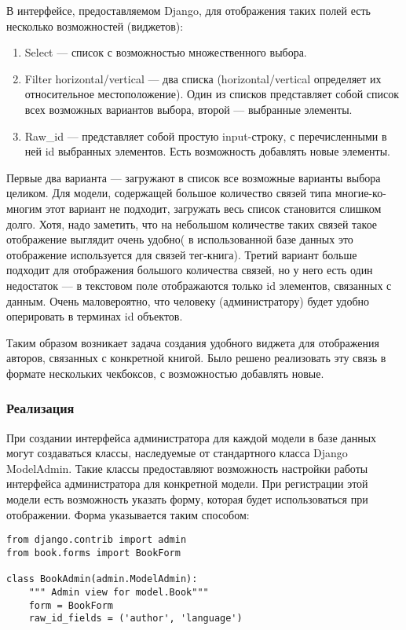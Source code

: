 В интерфейсе, предоставляемом Django, для отображения таких полей есть несколько возможностей (виджетов):
\begin{enumerate}
	\item Select --- список с возможностью множественного выбора.
	\item Filter horizontal/vertical --- два списка (horizontal/vertical определяет их относительное местоположение). Один из списков представляет собой список всех возможных вариантов выбора, второй --- выбранные элементы.
	\item Raw\_id --- представляет собой простую input-строку, с перечисленными в ней id выбранных элементов. Есть возможность добавлять новые элементы.
\end{enumerate}
Первые два варианта --- загружают в список все возможные варианты выбора целиком. Для модели, содержащей большое количество связей типа многие-ко-многим этот вариант не подходит, \tk загружать весь список становится слишком долго. Хотя, надо заметить, что на небольшом количестве таких связей такое отображение выглядит очень удобно( в использованной базе данных это отображение используется для связей тег-книга). 
Третий вариант больше подходит для отображения большого количества связей, но у него есть один недостаток --- в текстовом поле отображаются только id элементов, связанных с данным. Очень маловероятно, что человеку (администратору) будет удобно оперировать в терминах id объектов.

Таким образом возникает задача создания удобного виджета для отображения авторов, связанных с конкретной книгой.
Было решено реализовать эту связь в формате нескольких чекбоксов, с возможностью добавлять
новые.

\subsubsection{Реализация}

При создании интерфейса администратора для каждой модели в базе данных могут создаваться классы, наследуемые от стандартного класса Django ModelAdmin. Такие классы предоставляют возможность настройки работы интерфейса администратора для конкретной модели. При регистрации этой модели есть возможность указать форму, которая будет использоваться при отображении. Форма указывается таким способом:

{
\small \begin{verbatim}
from django.contrib import admin
from book.forms import BookForm

class BookAdmin(admin.ModelAdmin):
    """ Admin view for model.Book"""
    form = BookForm
    raw_id_fields = ('author', 'language')
\end{verbatim}
}

